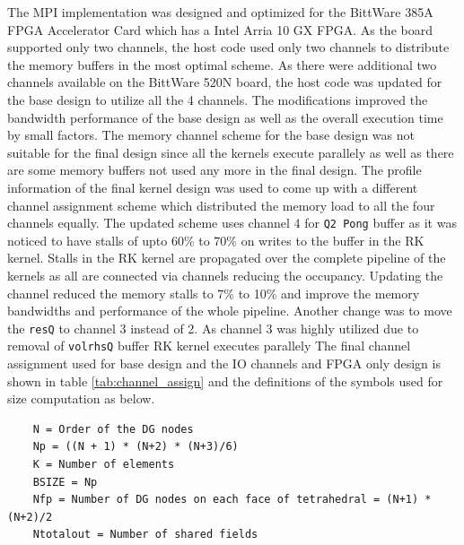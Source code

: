 The MPI implementation was designed and optimized for the BittWare 385A FPGA Accelerator Card which has a
Intel Arria 10 GX FPGA. As the board supported only two channels, the host code used only two channels
to distribute the memory buffers in the most optimal scheme. As there were additional two channels
available on the BittWare 520N board, the host code was updated for the base design to utilize
all the 4 channels. The modifications improved the bandwidth performance of the base design
as well as the overall execution time by small factors. The memory channel scheme
for the base design was not suitable for the final design since all the kernels execute
parallely as well as there are some memory buffers not used any more in the final design.
The profile information of the final kernel design was used to come up with a
different channel assignment scheme which distributed the memory load to all the
four channels equally. The updated scheme uses channel 4 for \texttt{Q2 Pong} buffer
as it was noticed to have stalls of upto 60\% to 70\% on writes to the buffer in the RK
kernel. Stalls in the RK kernel are propagated over the complete pipeline of the kernels
as all are connected via channels reducing the occupancy. Updating the channel reduced
the memory stalls to 7\% to 10\% and improve the memory bandwidths and performance
of the whole pipeline. Another change was to move the \texttt{resQ}
to channel 3 instead of 2. As channel 3 was highly utilized due to removal
of \texttt{volrhsQ} buffer RK kernel executes parallely The final channel assignment used for base design and the IO channels and
FPGA only design is shown in table \ref{tab:channel_assign} and the definitions of the symbols used for size computation as below.
\begin{verbatim}
    N = Order of the DG nodes
    Np = ((N + 1) * (N+2) * (N+3)/6)
    K = Number of elements
    BSIZE = Np
    Nfp = Number of DG nodes on each face of tetrahedral = (N+1) * (N+2)/2
    Ntotalout = Number of shared fields
\end{verbatim}
